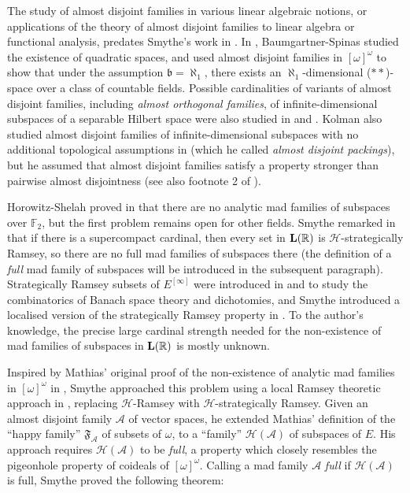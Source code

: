 \documentclass[10pt,a4paper]{amsart}
\theoremstyle{plain}
\numberwithin{equation}{section}
\theoremstyle{definition}
\newcommand{\R}{\mathbb{R}}
\newcommand{\cal}{\mathcal}
\renewcommand{\frak}{\mathfrak}
\newcommand{\A}{\cal{A}}
\renewcommand{\H}{\cal{H}}
\let\strokeL\L
\DeclareRobustCommand{\L}{\ifmmode\mathbf{L}\else\strokeL\fi}
\begin{document}
The study of almost disjoint families in various linear algebraic notions, or applications of the theory of almost disjoint families to linear algebra or functional analysis, predates Smythe's work in \cite{S19}. In \cite{BS91}, Baumgartner-Spinas studied the existence of quadratic spaces, and used almost disjoint families in $[\omega]^\omega$ to show that under the assumption $\frak{b} = \aleph_1$, there exists an $\aleph_1$-dimensional ($**$)-space over a class of countable fields. Possible cardinalities of variants of almost disjoint families, including \emph{almost orthogonal families}, of infinite-dimensional subspaces of a separable Hilbert space were also studied in \cite{B11} and \cite{W08}. Kolman also studied almost disjoint families of infinite-dimensional subspaces with no additional topological assumptions in \cite{K00} (which he called \emph{almost disjoint packings}), but he assumed that almost disjoint families satisfy a property stronger than pairwise almost disjointness (see also footnote 2 of \cite{S19}).

Horowitz-Shelah proved in \cite{HS22} that there are no analytic mad families of subspaces over $\mathbb{F}_2$, but the first problem remains open for other fields. Smythe remarked in \cite{S19} that if there is a supercompact cardinal, then every set in $\L(\R)$ is $\H$-strategically Ramsey, so there are no full mad families of subspaces there (the definition of a \emph{full} mad family of subspaces will be introduced in the subsequent paragraph). Strategically Ramsey subsets of $E^{[\infty]}$ were introduced in \cite{R09} and \cite{R10} to study the combinatorics of Banach space theory and dichotomies, and Smythe introduced a localised version of the strategically Ramsey property in \cite{S18}. To the author's knowledge, the precise large cardinal strength needed for the non-existence of mad families of subspaces in $\L(\R)$ is mostly unknown.

Inspired by Mathias' original proof of the non-existence of analytic mad families in $[\omega]^\omega$ in \cite{M77}, Smythe approached this problem using a local Ramsey theoretic approach in \cite{S19}, replacing $\H$-Ramsey with $\H$-strategically Ramsey. Given an almost disjoint family $\A$ of vector spaces, he extended Mathias' definition of the ``happy family'' $\mathfrak{F}_\A$ of subsets of $\omega$, to a ``family'' $\H(\A)$ of subspaces of $E$. His approach requires $\H(\A)$ to be \emph{full}, a property which closely resembles the pigeonhole property of coideals of $[\omega]^\omega$. Calling a mad family $\A$ \emph{full} if $\H(\A)$ is full, Smythe proved the following theorem:
\end{document}
